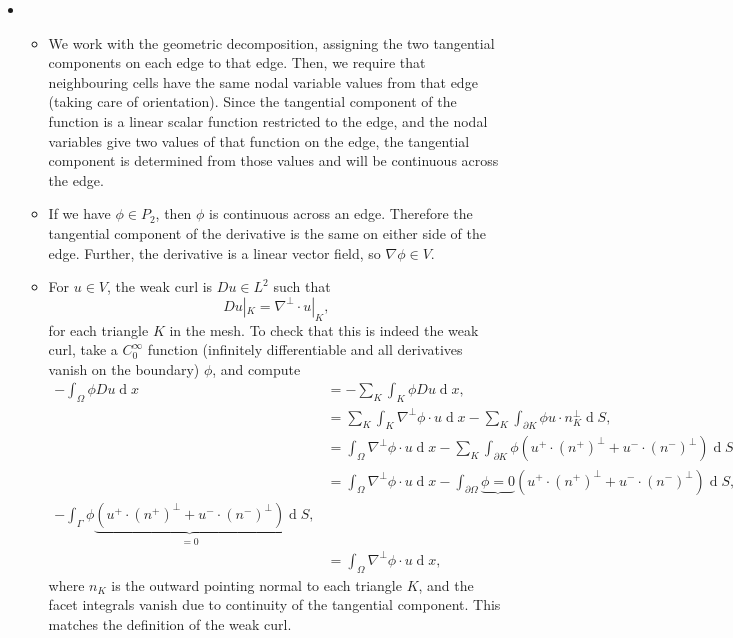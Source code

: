 \documentclass[11pt]{article}
\newcommand{\marb}[1]{\marginpar{~~\fbox{\,\mathstrut #1\,}}}
\newcommand{\marbup}[1]{\vspace*{-4mm} \par \marb{#1}}
\newcommand{\unseen}{\marbup{{\small unseen $\Downarrow$}}}
\newcommand{\simseen}{\marbup{{\small sim. seen $\Downarrow$}}}
\DeclareMathOperator{\diff}{d}
\newcounter{count_marks}
\newcounter{count_amarks}
\newcounter{count_bmarks}
\newcounter{count_cmarks}
\newcounter{count_dmarks}
\newcounter{count_mmarks} %
\newcommand{\cmarks}[1]{\addtocounter{count_marks}{#1} \addtocounter{count_cmarks}{#1}\marginpar{~~\fbox{\,\mathstrut #1, C}}}
\newcommand{\dmarks}[1]{\addtocounter{count_marks}{#1} \addtocounter{count_dmarks}{#1}\marginpar{~~\fbox{\,\mathstrut #1, D}}}
\newenvironment{Question}[1] 
 {\begin{itemize} \item[\large #1.~~]}{\end{itemize}\vfill
}
\newenvironment{Part}[1] 
 {\begin{itemize} \item[(#1)~~]}{\end{itemize}}
\begin{document}
\begin{Question}{3}
  \begin{Part}{a}\unseen
    We work with the geometric decomposition, assigning
    the two tangential components on each edge to that edge.
    Then, we require that neighbouring cells have the same
    nodal variable values from that edge (taking care
    of orientation). Since the tangential component of the
    function is a linear scalar function restricted to the edge,
    and the nodal variables give two values of that function on the
    edge, the tangential component is determined from those values
    and will be continuous across the edge.
    \cmarks{6}
  \end{Part}
  \begin{Part}{b}\unseen
    If we have $\phi\in P_2$, then $\phi$ is continuous across an edge.
    Therefore the tangential component of the derivative is the same
    on either side of the edge. Further, the derivative is a linear
    vector field, so $\nabla\phi\in V$.
    \dmarks{8}
  \end{Part}
  \begin{Part}{c}\simseen
    For $u\in V$, the weak curl is $Du\in L^2$ such that
    \begin{equation}
      Du|_K = \nabla^{\perp}\cdot u|_K,
    \end{equation}
    for each triangle $K$ in the mesh. To check that this is indeed
    the weak curl, take a $C^\infty_0$ function (infinitely
    differentiable and all derivatives vanish on the boundary) $\phi$,
    and compute
    \begin{align}
      -\int_\Omega \phi Du \diff x & = -\sum_K \int_K
      \phi Du \diff x, \\
      & = \sum_K \int_K  \nabla^\perp\phi\cdot u \diff x
      - \sum_K \int_{\partial K} \phi u\cdot n_K^\perp \diff S, \\
     & = \int_\Omega  \nabla^\perp\phi\cdot u \diff x
      - \sum_K \int_{\partial K} \phi (u^+\cdot (n^+)^{\perp} + u^-\cdot (n^-)^{\perp}) \diff S, \\
      & = \int_\Omega  \nabla^\perp\phi\cdot u\diff x
      - \int_{\partial \Omega} \underbrace{\phi=0}
      (u^+\cdot (n^+)^{\perp} + u^-\cdot (n^-)^{\perp}) \diff S, \\
      - \int_{\Gamma} \phi \underbrace{(u^+\cdot (n^+)^{\perp} + u^-\cdot (n^-)^{\perp})}_{=0} \diff S, \\
      & = \int_\Omega  \nabla^\perp\phi\cdot u \diff x,
    \end{align}
    where $n_K$ is the outward pointing normal to each triangle $K$,
    and the facet integrals vanish due to continuity of the tangential
    component. This matches the definition of the weak curl.
    \cmarks{6}
  \end{Part}
\end{Question}
\end{document}
